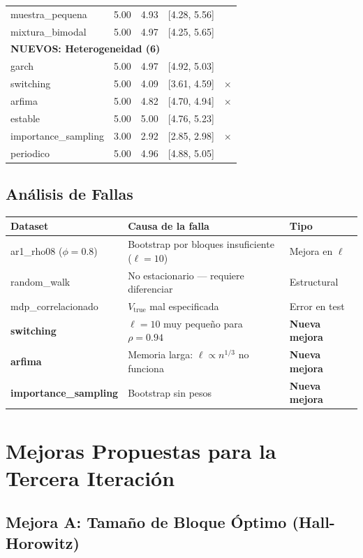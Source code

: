 \documentclass[12pt,a4paper]{article}
\newcommand{\ok}{\textcolor{cbgreen}{\checkmark}}
\newcommand{\fail}{\textcolor{cbred}{$\times$}}
\begin{document}
\begin{longtable}{@{}lcccc@{}}
muestra\_pequena & 5.00 & 4.93 & [4.28, 5.56] & \ok \\
mixtura\_bimodal & 5.00 & 4.97 & [4.25, 5.65] & \ok \\
\midrule
\multicolumn{5}{l}{\textbf{NUEVOS: Heterogeneidad (6)}} \\
garch & 5.00 & 4.97 & [4.92, 5.03] & \ok \\
switching & 5.00 & 4.09 & [3.61, 4.59] & \fail \\
arfima & 5.00 & 4.82 & [4.70, 4.94] & \fail \\
estable & 5.00 & 5.00 & [4.76, 5.23] & \ok \\
importance\_sampling & 3.00 & 2.92 & [2.85, 2.98] & \fail \\
periodico & 5.00 & 4.96 & [4.88, 5.05] & \ok \\
\bottomrule
\end{longtable}

\subsection{Análisis de Fallas}

\begin{longtable}{@{}lll@{}}
\toprule
Dataset & Causa de la falla & Tipo \\
\midrule
\endhead
ar1\_rho08 ($\phi=0.8$) & Bootstrap por bloques insuficiente ($\ell=10$) & Mejora en $\ell$ \\
random\_walk & No estacionario --- requiere diferenciar & Estructural \\
mdp\_correlacionado & $V_{\text{true}}$ mal especificada & Error en test \\
\textbf{switching} & $\ell=10$ muy pequeño para $\rho=0.94$ & \textbf{Nueva mejora} \\
\textbf{arfima} & Memoria larga: $\ell \propto n^{1/3}$ no funciona & \textbf{Nueva mejora} \\
\textbf{importance\_sampling} & Bootstrap sin pesos & \textbf{Nueva mejora} \\
\bottomrule
\end{longtable}

\newpage

\section{Mejoras Propuestas para la Tercera Iteración}

\subsection{Mejora A: Tamaño de Bloque Óptimo (Hall-Horowitz)}
\end{document}
